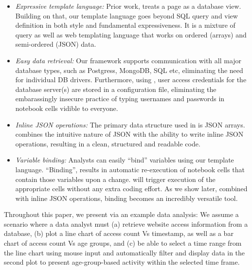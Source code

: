 \begin{itemize}
	\item \textit{Expressive template language:} Prior work, treats a page as a database view. Building on that, our template language goes beyond SQL query and view definition in both style and fundamental expressiveness. It is a mixture of query as well as web templating language that works on ordered (arrays) and semi-ordered (JSON) data. 
	\item \textit{Easy data retrieval:} Our framework supports communication with all major database types, such as Postgress, MongoDB, SQL etc, eliminating the need for individual DB drivers. Furthermore, using {\projname}, user access credentials for the database server(s) are stored in a configuration file, eliminating the embarassingly insecure practice of typing usernames and passwords in notebook cells vidible to everyone.
	\item \textit{Inline JSON operations:} The primary data structure used in {\projname} is JSON arrays. {\projname} combines the intuitive nature of JSON with the ability to write inline JSON operations, resulting in a clean, structured and readable code.
	\item \textit{Variable binding:} Analysts can easily ``bind'' variables using our template language. ``Binding'', results in automatic re-execution of notebook cells that contain those variables upon a change. {\projname} will trigger execution of the appropriate cells without any extra coding effort. As we show later, combined with inline JSON operations, binding becomes an incredibly versatile tool.

\end{itemize}

Throughout this paper, we present {\projname} via an example data analysis: We assume a scenario where a data analyst must (a) retrieve  website access information from a database, (b) plot a line chart of access count Vs timestamp, as well as a bar chart of access count Vs age groups, and (c) be able to select a time range from the line chart using mouse input and automatically filter and display data in the second plot to present age-group-based activity within the selected time frame. 

